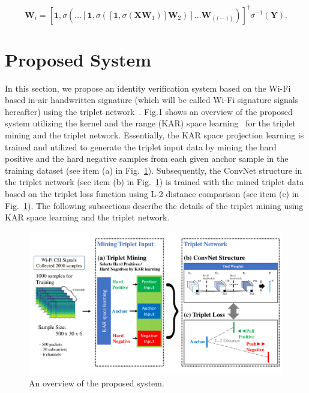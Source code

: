 \documentclass[runningheads]{llncs}
\begin{document}
\begin{equation}
    \mathbf{W}_{i} = \left[\mathbf{1},\sigma\left(\dots\left[\mathbf{1},\sigma\left(\left[\mathbf{1},\sigma\left(\mathbf{X}\mathbf{W}_{1}\right)\right]\mathbf{W}_{2}\right)\right]\dots\mathbf{W}_{(i-1)}\right)\right]^{\dagger}\sigma^{-1}\left(\mathbf{Y}\right).
\end{equation}



\section{Proposed System}

In this section, we propose an identity verification system based on the Wi-Fi based in-air handwritten signature (which will be called Wi-Fi signature signals hereafter) using the triplet network~\cite{hoffer2015deep}. Fig.1 shows an overview of the proposed system utilizing the kernel and the range (KAR) space learning~\cite{toh2018learning,toh2018gradient} for the triplet mining and the triplet network.
Essentially, the KAR space projection learning is trained and utilized to generate the triplet input data by mining the hard positive and the hard negative samples from each given anchor sample in the training dataset (see item (a) in Fig.~\ref{fig1}).
Subsequently, the ConvNet structure in the triplet network (see item (b) in Fig.~\ref{fig1}) is trained with the mined triplet data based on the triplet loss function using L-2 distance comparison (see item (c) in Fig.~\ref{fig1}).
The following subsections describe the details of the triplet mining using KAR space learning and the triplet network.

\begin{figure}[!ht]
    \includegraphics[width=\textwidth]{fig1_tcnn_kar_v5}
    \caption{An overview of the proposed system.} \label{fig1}
\end{figure}
\end{document}
